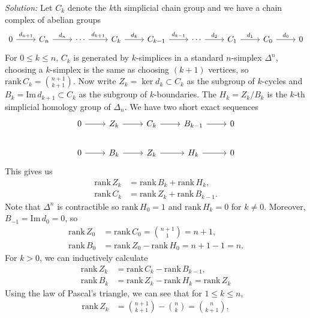 \documentclass[a4paper, 12pt]{article}
\newenvironment{solution}
    {\textit{Solution:}}
    {}
\newcommand{\rank}{\text{rank}\,}
\newcommand{\im}{\text{Im}\,}
\begin{document}
\begin{solution}
Let \(C_k\) denote the \(k\)th simplicial chain group and we have a chain complex of abelian groups 
\[\begin{tikzcd}
	0 & {C_n} & \cdots & {C_k} & {C_{k-1}} & \cdots & {C_1} & {C_0} & 0
	\arrow["{d_{n+1}}", from=1-1, to=1-2]
	\arrow["{d_n}", from=1-2, to=1-3]
	\arrow["{d_{k+1}}", from=1-3, to=1-4]
	\arrow["{d_k}", from=1-4, to=1-5]
	\arrow["{d_{k-1}}", from=1-5, to=1-6]
	\arrow["{d_2}", from=1-6, to=1-7]
	\arrow["{d_1}", from=1-7, to=1-8]
	\arrow["{d_0}", from=1-8, to=1-9]
\end{tikzcd}\]
For \(0\leq k\leq n\), \(C_k\) is generated by \(k\)-simplices in a standard \(n\)-simplex \(\Delta^n\), choosing a \(k\)-simplex is the same as choosing \((k+1)\) vertices, so \(\rank C_k=\binom{n+1}{k+1}\). Now write 
\(Z_k=\ker d_k\subset C_k\) as the subgroup of \(k\)-cycles and \(B_k=\im d_{k+1}\subset C_k\) as the subgroup of \(k\)-boundaries. The \(H_k=Z_k/B_k\) is the \(k\)-th simplicial homology group of \(\Delta_n\). We have two short exact sequences 
\[\begin{tikzcd}
	0 & {Z_k} & {C_k} & {B_{k-1}} & 0 \\
	0 & {B_k} & {Z_k} & {H_k} & 0
	\arrow[from=1-1, to=1-2]
	\arrow[from=1-2, to=1-3]
	\arrow[from=1-3, to=1-4]
	\arrow[from=1-4, to=1-5]
	\arrow[from=2-1, to=2-2]
	\arrow[from=2-2, to=2-3]
	\arrow[from=2-3, to=2-4]
	\arrow[from=2-4, to=2-5]
\end{tikzcd}\]
This gives us 
\begin{align*}
    \rank Z_k&=\rank B_k+\rank H_k,\\ 
    \rank C_k&=\rank Z_k+\rank B_{k-1}.
\end{align*}
Note that \(\Delta^n\) is contractible so \(\rank H_0=1\) and \(\rank H_k=0\) for \(k\neq 0\). Moreover, \(B_{-1}=\im d_0=0\), so 
\begin{align*}
    \rank Z_0&=\rank C_0=\binom{n+1}{1}=n+1,\\
    \rank B_0&=\rank Z_0-\rank H_0=n+1-1=n.
\end{align*}
For \(k>0\), we can inductively calculate 
\begin{align*}
    \rank Z_k&=\rank C_k-\rank B_{k-1},\\
    \rank B_k&=\rank Z_k-\rank H_k=\rank Z_k
\end{align*}
Using the law of Pascal's triangle, we can see that for \(1\leq k\leq n\),  
\begin{align*}
    \rank Z_k&=\binom{n+1}{k+1}-\binom{n}{k}=\binom{n}{k+1},\\ 

\end{align*}
\end{solution}
\end{document}
